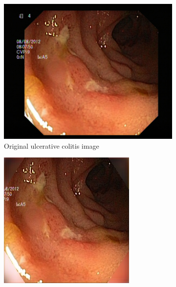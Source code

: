\begin{figure}
        \tiny
        \begin{subfigure}[t]{\myfigsizethree}
            \centering
            \includegraphics[height=\textwidth ,width=\textwidth]{experiments/figures/blackcorner/ucORIG.jpg}
            \caption{ Original ulcerative colitis image}    
            \label{fig:polyp_ORIG_CORNER2}
        \end{subfigure}
        \qquad
        \begin{subfigure}[t]{\myfigsizethree}
            \centering
            \includegraphics[width=\textwidth]{experiments/figures/blackcorner/ucAE.jpg}

\end{subfigure}
\end{figure}
